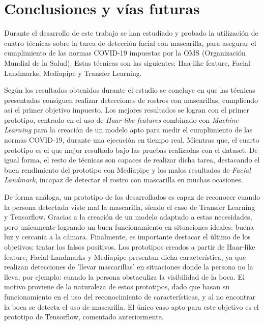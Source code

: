 
\chapter{Conclusiones y vías futuras}

Durante el desarrollo de este trabajo se han estudiado y probado la utilización de cuatro técnicas sobre la tarea de detección facial con mascarilla, para asegurar el cumplimiento de las normas COVID-19 impuestas por la OMS (Organización Mundial de la Salud). Estas técnicas son las siguientes: Haa-like feature, Facial Landmarks, Mediapipe y Transfer Learning.

Según los resultados obtenidos durante el estudio se concluye en que las técnicas presentadas consiguen realizar detecciones de rostros con mascarillas, cumpliendo así el primer objetivo impuesto. Los mejores resultados se logran con el primer prototipo, centrado en el uso de \textit{Haar-like features} combinado con \textit{Machine Learning} para la creación de un modelo apto para medir el cumplimiento de las normas COVID-19, durante una ejecución en tiempo real. Mientras que, el cuarto prototipo es el que mejor resultado bajo las pruebas realizadas con el dataset. De igual forma, el resto de técnicas son capaces de realizar dicha tarea, destacando el buen rendimiento del prototipo con Mediapipe y los malos resultados de \textit{Facial Landmark}, incapaz de detectar el rostro con mascarilla en muchas ocasiones.

De forma análoga, un prototipo de los desarrollados es capaz de reconocer cuando la persona detectada viste mal la mascarilla, siendo el caso de Transfer Learning y Tensorflow. Gracias a la creación de un modelo adaptado a estas necesidades, pero unicamente logrando un buen funcionamiento en situaciones ideales: buena luz y cercanía a la cámara. Finalmente, es importante destacar el último de los objetivos: tratar los falsos positivos. Los prototipos creados a partir de Haar-like feature, Facial Landmarks y Mediapipe presentan dicha característica, ya que realizan detecciones de 'llevar mascarillas' en situaciones donde la persona no la lleva, por ejemplo: cuando la persona obstaculiza la visibilidad de la boca. El motivo proviene de la naturaleza de estos prototipos, dado que basan su funcionamiento en el uso del reconocimiento de características, y al no encontrar la boca se detecta el uso de mascarilla. El único caso apto para este objetivo es el prototipo de Tensorflow, comentado anteriormente.


